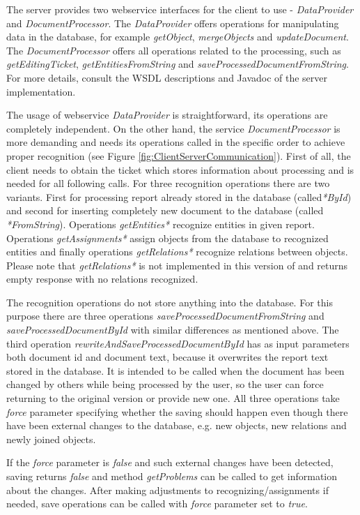 The \textan{} server provides two webservice interfaces for the client to use -
\emph{DataProvider} and \emph{DocumentProcessor}. The
\emph{DataProvider} offers operations for manipulating data in the database,
for example \emph{getObject}, \emph{mergeObjects} and \emph{updateDocument}.
The \emph{DocumentProcessor} offers all operations related to the processing,
such as \emph{getEditingTicket}, \emph{getEntitiesFromString} and
\emph{saveProcessedDocumentFromString}.
For more details, consult the WSDL descriptions and Javadoc of the server
implementation.

The usage of webservice \emph{DataProvider} is straightforward, its operations
are completely independent. On the other hand, the service
\emph{DocumentProcessor} is more demanding and needs its operations
called in the specific order to achieve proper recognition (see Figure
\ref{fig:ClientServerCommunication}). First of all, the client needs to obtain
the ticket which stores information about processing and is needed for all
following calls. For three recognition operations there are two variants. First
for processing report already stored in the database (called\emph{*ById}) and
second for inserting completely new document to the database (called
\emph{*FromString}). Operations \emph{getEntities*} recognize entities in
given report. Operations \emph{getAssignments*} assign objects from the database
to recognized entities and finally operations \emph{getRelations*} recognize
relations between objects. Please note that \emph{getRelations*} is not
implemented in this version of \textan{} and returns empty response with no
relations recognized.

The recognition operations do not store anything into the database. For this
purpose there are three operations \emph{saveProcessedDocumentFromString} and
\emph{saveProcessedDocumentById} with similar differences as mentioned above.
The third operation \emph{rewriteAndSaveProcessedDocumentById} has as input
parameters both document id and document text, because it overwrites the report
text stored in the database. It is intended to be called when the document has
been changed by others while being processed by the user, so the user can
force returning to the original version or provide new one. All three operations
take \emph{force} parameter specifying whether the saving should happen even
though there have been external changes to the database, e.g. new objects, new
relations and newly joined objects.

If the \emph{force} parameter is \emph{false} and such external changes have
been detected, saving returns \emph{false} and method \emph{getProblems} can be
called to get information about the changes. After making adjustments to
recognizing/assignments if needed, save operations can be called with
\emph{force} parameter set to \emph{true}.

